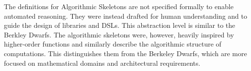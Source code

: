     The definitions for Algorithmic Skeletons are not specified formally to
    enable automated reasoning.
    They were instead drafted for human understanding and to
    guide the design of libraries and DSLs.
    This abstraction level is similar to the Berkley Dwarfs.
    The algorithmic skeletons were, however, heavily inspired by higher-order
    functions and similarly describe the algorithmic structure of computations.
    This distinguishes them from the Berkeley Dwarfs, which are more focused on
    mathematical domains and architectural requirements.
